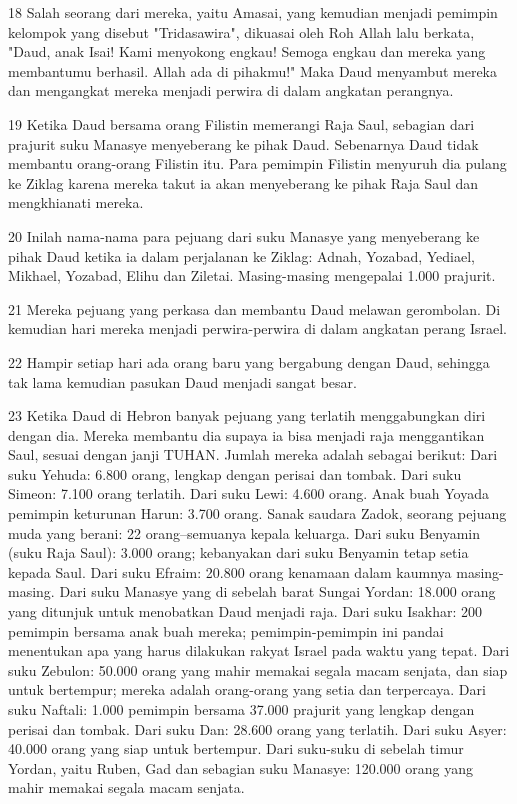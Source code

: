 \par 18 Salah seorang dari mereka, yaitu Amasai, yang kemudian menjadi pemimpin kelompok yang disebut "Tridasawira", dikuasai oleh Roh Allah lalu berkata, "Daud, anak Isai! Kami menyokong engkau! Semoga engkau dan mereka yang membantumu berhasil. Allah ada di pihakmu!" Maka Daud menyambut mereka dan mengangkat mereka menjadi perwira di dalam angkatan perangnya.
\par 19 Ketika Daud bersama orang Filistin memerangi Raja Saul, sebagian dari prajurit suku Manasye menyeberang ke pihak Daud. Sebenarnya Daud tidak membantu orang-orang Filistin itu. Para pemimpin Filistin menyuruh dia pulang ke Ziklag karena mereka takut ia akan menyeberang ke pihak Raja Saul dan mengkhianati mereka.
\par 20 Inilah nama-nama para pejuang dari suku Manasye yang menyeberang ke pihak Daud ketika ia dalam perjalanan ke Ziklag: Adnah, Yozabad, Yediael, Mikhael, Yozabad, Elihu dan Ziletai. Masing-masing mengepalai 1.000 prajurit.
\par 21 Mereka pejuang yang perkasa dan membantu Daud melawan gerombolan. Di kemudian hari mereka menjadi perwira-perwira di dalam angkatan perang Israel.
\par 22 Hampir setiap hari ada orang baru yang bergabung dengan Daud, sehingga tak lama kemudian pasukan Daud menjadi sangat besar.
\par 23 Ketika Daud di Hebron banyak pejuang yang terlatih menggabungkan diri dengan dia. Mereka membantu dia supaya ia bisa menjadi raja menggantikan Saul, sesuai dengan janji TUHAN. Jumlah mereka adalah sebagai berikut: Dari suku Yehuda: 6.800 orang, lengkap dengan perisai dan tombak. Dari suku Simeon: 7.100 orang terlatih. Dari suku Lewi: 4.600 orang. Anak buah Yoyada pemimpin keturunan Harun: 3.700 orang. Sanak saudara Zadok, seorang pejuang muda yang berani: 22 orang--semuanya kepala keluarga. Dari suku Benyamin (suku Raja Saul): 3.000 orang; kebanyakan dari suku Benyamin tetap setia kepada Saul. Dari suku Efraim: 20.800 orang kenamaan dalam kaumnya masing-masing. Dari suku Manasye yang di sebelah barat Sungai Yordan: 18.000 orang yang ditunjuk untuk menobatkan Daud menjadi raja. Dari suku Isakhar: 200 pemimpin bersama anak buah mereka; pemimpin-pemimpin ini pandai menentukan apa yang harus dilakukan rakyat Israel pada waktu yang tepat. Dari suku Zebulon: 50.000 orang yang mahir memakai segala macam senjata, dan siap untuk bertempur; mereka adalah orang-orang yang setia dan terpercaya. Dari suku Naftali: 1.000 pemimpin bersama 37.000 prajurit yang lengkap dengan perisai dan tombak. Dari suku Dan: 28.600 orang yang terlatih. Dari suku Asyer: 40.000 orang yang siap untuk bertempur. Dari suku-suku di sebelah timur Yordan, yaitu Ruben, Gad dan sebagian suku Manasye: 120.000 orang yang mahir memakai segala macam senjata.
